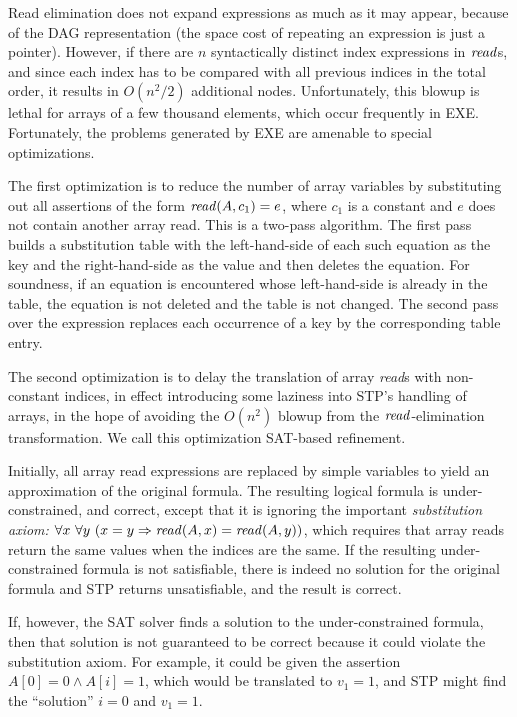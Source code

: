 \documentclass[11pt]{article}
\newcommand{\stpread}{{\it read}}
\begin{document}
Read elimination does not expand expressions as much as it may appear,
because of the DAG representation (the space cost of repeating an
expression is just a pointer).  However, if there are $n$
syntactically distinct index expressions in $\stpread$s, and since
each index has to be compared with all previous indices in the total
order, it results in $O(n^2/2)$ additional nodes.  Unfortunately, this
blowup is lethal for arrays of a few thousand elements, which occur
frequently in EXE.  Fortunately, the problems generated by EXE are
amenable to special optimizations.

The first optimization is to reduce the number of array variables by
substituting out all assertions of the form $\stpread(A, c_1) = e$, where $c_1$
is a constant and $e$ does not contain 
another array read.
This is a two-pass
algorithm.  The first pass builds a substitution table with the
left-hand-side of each such equation as the key and the
right-hand-side as the value and then deletes the equation.
For soundness, if an equation is encountered whose left-hand-side
is already in the table, the equation is not deleted and the table
is not changed.  The second pass over the expression replaces each
occurrence of a key by the corresponding table entry.

The second optimization is to delay the translation of array
{\stpread}s with non-constant indices, in effect introducing some
laziness into STP's handling of arrays, in the hope of avoiding the
$O(n^2)$ blowup from the $\stpread$-elimination transformation. We
call this optimization SAT-based refinement. 

Initially, all array read expressions are replaced by simple variables
to yield an approximation of the original formula.  The resulting
logical formula is under-constrained, and correct, except that it is
ignoring the important {\em substitution axiom:} $\forall x\ \forall
y\ (x = y \Rightarrow
\stpread(A,x) =
\stpread(A,y))$, which requires that array reads return the same
values when the indices are the same. If the resulting
under-constrained formula is not satisfiable, there is indeed no
solution for the original formula and STP returns unsatisfiable, and
the result is correct. 

If, however, the SAT solver finds a solution to the under-constrained
formula, then that solution is not guaranteed to be correct because it
could violate the substitution axiom.  For example, it could be given
the assertion $A[0] = 0 \wedge A[i] = 1$, which would be translated to
$v_1 = 1$, and STP might find the ``solution'' $i = 0$ and $v_1 =
1$. 
\end{document}
